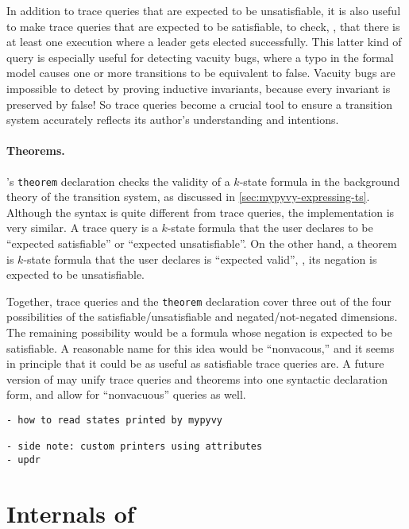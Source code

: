 In addition to trace queries that are expected to be unsatisfiable,
  it is also useful to make trace queries that are expected to be satisfiable,
  to check, \eg, that there is at least one execution where a leader gets elected successfully.
This latter kind of query is especially useful for detecting vacuity bugs,
  where a typo in the formal model causes one or more transitions
  to be equivalent to \textsf{false}.
Vacuity bugs are impossible to detect by proving inductive invariants,
  because every invariant is preserved by \textsf{false}!
So trace queries become a crucial tool to ensure a transition system
  accurately reflects its author's understanding and intentions.

\paragraph{Theorems.}
\mypyvy's \lstinline[language=mypyvy]{theorem} declaration checks
  the validity of a $k$-state formula in the background theory of the transition system,
  as discussed in \cref{sec:mypyvy-expressing-ts}.
Although the syntax is quite different from trace queries,
  the implementation is very similar.
A trace query is a $k$-state formula that the user declares to be
  ``expected satisfiable'' or ``expected unsatisfiable''.
On the other hand, a theorem is $k$-state formula that the user
  declares is ``expected valid'', \ie, its negation is expected to be unsatisfiable.

Together, trace queries and the \lstinline[language=mypyvy]{theorem} declaration
  cover three out of the four possibilities
  of the satisfiable/unsatisfiable and negated/not-negated dimensions.
The remaining possibility would be a formula whose negation is expected to be satisfiable.
A reasonable name for this idea would be ``nonvacous,''
  and it seems in principle that it could be as useful as satisfiable trace queries are.
A future version of \mypyvy may unify trace queries and theorems
  into one syntactic declaration form,
  and allow for ``nonvacuous'' queries as well.

\begin{verbatim}
- how to read states printed by mypyvy

- side note: custom printers using attributes
- updr
\end{verbatim}

\section{Internals of \mypyvy}

